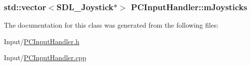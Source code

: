 \subsubsection[{\texorpdfstring{m\+Joysticks}{mJoysticks}}]{\setlength{\rightskip}{0pt plus 5cm}std\+::vector$<$S\+D\+L\+\_\+\+Joystick$\ast$$>$ P\+C\+Input\+Handler\+::m\+Joysticks\hspace{0.3cm}{\ttfamily [private]}}\hypertarget{classPCInputHandler_ac02fcaf3e1c2250b4b55e7b755d2ea57}{}\label{classPCInputHandler_ac02fcaf3e1c2250b4b55e7b755d2ea57}


The documentation for this class was generated from the following files\+:\begin{DoxyCompactItemize}
\item 
Input/\hyperlink{PCInputHandler_8h}{P\+C\+Input\+Handler.\+h}\item 
Input/\hyperlink{PCInputHandler_8cpp}{P\+C\+Input\+Handler.\+cpp}\end{DoxyCompactItemize}
